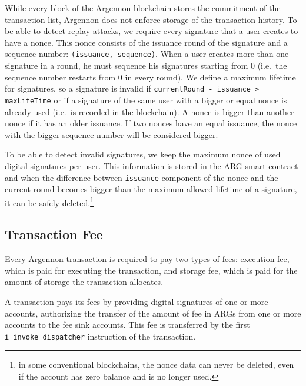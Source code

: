 While every block of the Argennon blockchain stores the commitment of the transaction list, Argennon does not enforce
storage of the transaction history. To be able to detect replay attacks, we require
every signature that a user creates to have a nonce. This nonce consists of the issuance round of the signature
and a sequence number: \texttt{(issuance,\ sequence)}. When a user creates more than one signature in a round, he
must sequence his signatures starting from 0 (i.e.~the sequence number restarts from 0 in every round). We define
a maximum lifetime for signatures, so a signature is invalid if \texttt{currentRound - issuance > maxLifeTime} or
if a signature of the same user with a bigger or equal nonce is already used
(i.e.~is recorded in the blockchain). A nonce is bigger than another nonce if it has an older issuance. If two
nonces have an equal issuance, the nonce with the bigger sequence number will be considered bigger.

To be able to detect invalid signatures, we keep the maximum nonce of used digital signatures per user. This information
is stored in the ARG smart contract and when the difference between \texttt{issuance} component of the nonce and
the current round becomes bigger than the maximum allowed lifetime of a signature, it can be safely
deleted.\footnote{in some conventional
blockchains, the nonce data can never be deleted, even if the account has zero balance and is no longer used.}

\subsection{Transaction Fee}\label{subsec:fee}

Every Argennon transaction is required to pay two types of fees: execution fee, which is paid for executing the
transaction, and storage fee, which is paid for the amount of storage the transaction allocates.

A transaction pays
its fees by providing digital signatures of one or more accounts, authorizing the transfer of the amount of fee in
ARGs from one or more accounts to the fee sink accounts. This fee is transferred by the first
\texttt{i\_invoke\_dispatcher} instruction of the transaction.


